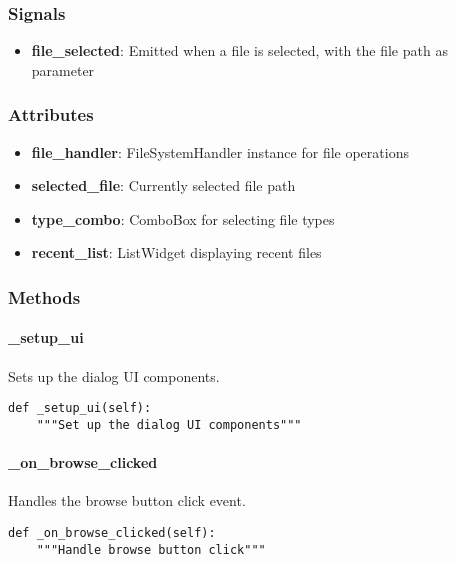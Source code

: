 \subsubsection{Signals}

\begin{itemize}
    \item \textbf{file\_selected}: Emitted when a file is selected, with the file path as parameter
\end{itemize}

\subsubsection{Attributes}

\begin{itemize}
    \item \textbf{file\_handler}: FileSystemHandler instance for file operations
    \item \textbf{selected\_file}: Currently selected file path
    \item \textbf{type\_combo}: ComboBox for selecting file types
    \item \textbf{recent\_list}: ListWidget displaying recent files
\end{itemize}

\subsubsection{Methods}

\paragraph{\_setup\_ui}

Sets up the dialog UI components.

\begin{verbatim}
def _setup_ui(self):
    """Set up the dialog UI components"""
\end{verbatim}

\paragraph{\_on\_browse\_clicked}

Handles the browse button click event.

\begin{verbatim}
def _on_browse_clicked(self):
    """Handle browse button click"""
\end{verbatim}

